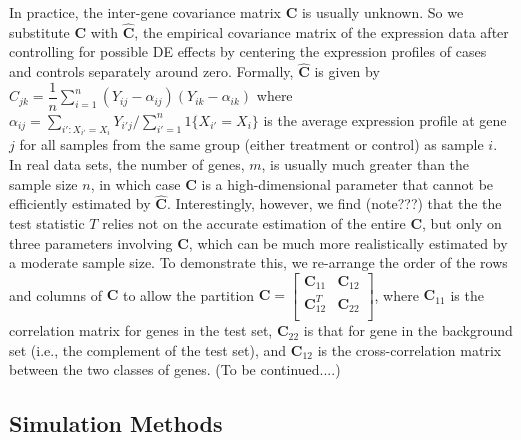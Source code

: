 \documentclass[useAMS,usenatbib, galley]{biom}
\newcommand{\OurMethod}{MEQLEA}
\begin{document}
	In practice, the inter-gene covariance matrix $\bm C$ is usually unknown. So we substitute $\bm C$ with $\hat {\bm C}$, the empirical covariance matrix of the expression data after controlling for possible DE effects by centering the expression profiles of cases and controls separately around zero. Formally, $\hat {\bm C}$ is given by $\hat C_{jk}=\dfrac{1}{n}\sum_{i=1}^n(Y_{ij}-\alpha_{ij})(Y_{ik}-\alpha_{ik})$ where $\alpha_{ij}=\sum_{i':X_{i'}=X_{i}}Y_{i'j}/\sum_{i'=1}^n1\{X_{i'}=X_{i}\}$ is the average expression profile at gene $j$ for all samples from the same group (either treatment or control) as sample $i$. In real data sets, the number of genes, $m$, is usually much greater than the sample size $n$, in which case $\bm C$ is a high-dimensional parameter that cannot be efficiently estimated by $\hat {\bm C}$. Interestingly, however, we find (note???) that the the test statistic $T$ relies not on the accurate estimation of the entire $\bm C$, but only on three parameters involving $\bm C$, which can be much more realistically estimated by a moderate sample size. To demonstrate this, we re-arrange the order of the rows and columns of $\bm C$ to allow the partition $\bm C=\left[\begin{array}{cc}
	\bm C_{11} & \bm C_{12} \\       \bm C_{12}^T & \bm C_{22} \\      \end{array}\right] $,
	where $\bm C_{11}$ is the correlation matrix for genes in the test set, $\bm C_{22}$ is that for gene in the background set (i.e., the complement of the test set), and $\bm C_{12}$ is the cross-correlation matrix between the two classes of genes. (To be continued....)

	
	
	
	\subsection{Simulation Methods}
	
\end{document}
